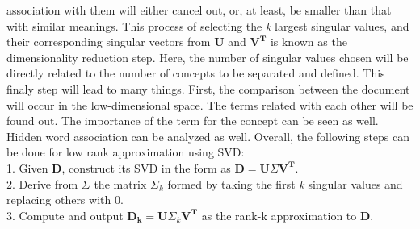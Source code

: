 \documentclass[12pt]{report}
\begin{document}
        association with them will either cancel out, or, at least, be smaller than that with similar meanings.
        This process of selecting the \emph{k} largest singular values, and their corresponding singular vectors from \textbf{U} and ${\mathbf{V^T}}$ is known as the dimensionality reduction step. 
        Here, the number of singular values chosen will be directly related to the number of concepts to be separated and defined.
        This finaly step will lead to many things. First, the comparison between the document will occur in the low-dimensional space. The terms related with each other will be found out. 
        The importance of the term for the concept can be seen as well. Hidden word association can be analyzed as well.   
        Overall, the following steps can be done for low rank approximation using SVD:\\
        1. Given \textbf{D}, construct its SVD in the form as ${\mathbf{D} = \mathbf{U} \Sigma  \mathbf{V^T}}$.\\
        2. Derive from ${\Sigma}$ the matrix ${\Sigma_k}$ formed by taking the first \emph{k} singular values and replacing others with 0.\\
        3. Compute and output ${\mathbf{D_k} = \mathbf{U} \Sigma_k  \mathbf{V^T}}$ as the rank-k approximation to \textbf{D}.\cite{cambridge2009online}
        
\end{document}
